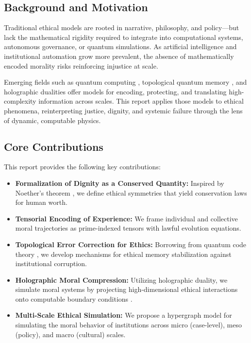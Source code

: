\documentclass{article}
\theoremstyle{plain}
\theoremstyle{claimstyle}
\begin{document}
\subsection{Background and Motivation}

Traditional ethical models are rooted in narrative, philosophy, and policy—but lack the mathematical rigidity required to integrate into computational systems, autonomous governance, or quantum simulations. As artificial intelligence and institutional automation grow more prevalent, the absence of mathematically encoded morality risks reinforcing injustice at scale.

Emerging fields such as quantum computing \citep{Nielsen2010}, topological quantum memory \citep{Kitaev2003}, and holographic dualities \citep{Maldacena1998} offer models for encoding, protecting, and translating high-complexity information across scales. This report applies those models to ethical phenomena, reinterpreting justice, dignity, and systemic failure through the lens of dynamic, computable physics.

\subsection{Core Contributions}

This report provides the following key contributions:

\begin{itemize}
    \item \textbf{Formalization of Dignity as a Conserved Quantity:} Inspired by Noether's theorem \citep{Noether1918}, we define ethical symmetries that yield conservation laws for human worth.
    \item \textbf{Tensorial Encoding of Experience:} We frame individual and collective moral trajectories as prime-indexed tensors with lawful evolution equations.
    \item \textbf{Topological Error Correction for Ethics:} Borrowing from quantum code theory \citep{Kitaev2003}, we develop mechanisms for ethical memory stabilization against institutional corruption.
    \item \textbf{Holographic Moral Compression:} Utilizing holographic duality, we simulate moral systems by projecting high-dimensional ethical interactions onto computable boundary conditions \citep{Maldacena1998}.
    \item \textbf{Multi-Scale Ethical Simulation:} We propose a hypergraph model for simulating the moral behavior of institutions across micro (case-level), meso (policy), and macro (cultural) scales.
\end{itemize}
\end{document}
